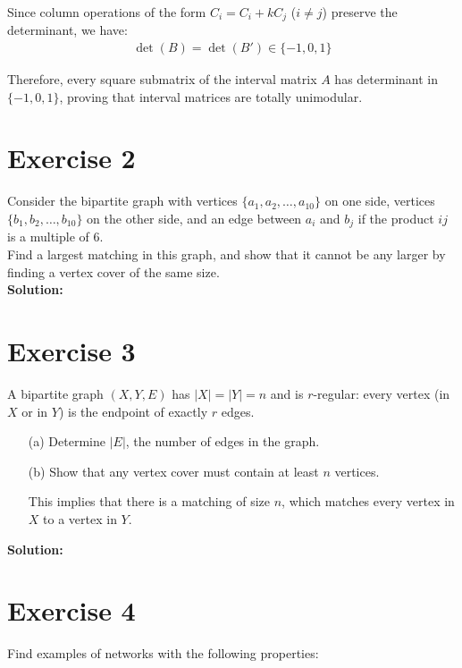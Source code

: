 \documentclass{article}
\begin{document}
Since column operations of the form $C_i = C_i + kC_j$ ($i \neq j$) preserve the determinant, we have:
\begin{align*}
\det(B) = \det(B') \in \{-1, 0, 1\}
\end{align*}

Therefore, every square submatrix of the interval matrix $A$ has determinant in $\{-1, 0, 1\}$, proving that interval matrices are totally unimodular.

\newpage

\section*{Exercise 2}
Consider the bipartite graph with vertices $\{a_1, a_2, \ldots, a_{10}\}$ on one side, vertices $\{b_1, b_2, \ldots, b_{10}\}$ on the other side, and an edge between $a_i$ and $b_j$ if the product $ij$ is a multiple of 6. \\

Find a largest matching in this graph, and show that it cannot be any larger by finding a vertex cover of the same size. \\

\textbf{Solution:} \\



\newpage

\section*{Exercise 3}
A bipartite graph $(X,Y,E)$ has $|X| = |Y| = n$ and is $r$-regular: every vertex (in $X$ or in $Y$) is the endpoint of exactly $r$ edges.

\begin{itemize}
    \item[(a)] Determine $|E|$, the number of edges in the graph.
    \item[(b)] Show that any vertex cover must contain at least $n$ vertices.
    
    This implies that there is a matching of size $n$, which matches every vertex in $X$ to a vertex in $Y$.
\end{itemize}

\textbf{Solution:} \\



\newpage

\section*{Exercise 4}
Find examples of networks with the following properties:
\end{document}
